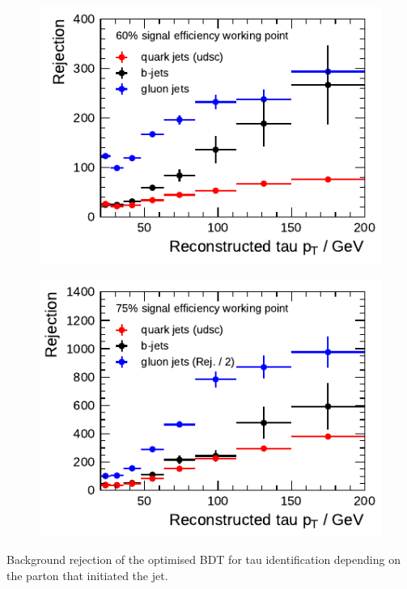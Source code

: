 \noindent
\begin{minipage}{\textwidth}
  \captionsetup{type=figure}
  \centering
  \begin{subfigure}[t]{0.48\textwidth}
    \centering
    \includegraphics{./figures/bdt_perf/parton/truth_parton_1p.pdf}
  \end{subfigure}\hfill
  \begin{subfigure}[t]{0.48\textwidth}
    \centering
    \includegraphics{./figures/bdt_perf/parton/truth_parton_3p.pdf}
  \end{subfigure}
  \caption[Background rejection of the BDT depending on the initiating
  parton]{Background rejection of the optimised BDT for tau identification
    depending on the parton that initiated the jet.}
\end{minipage}

\clearpage
